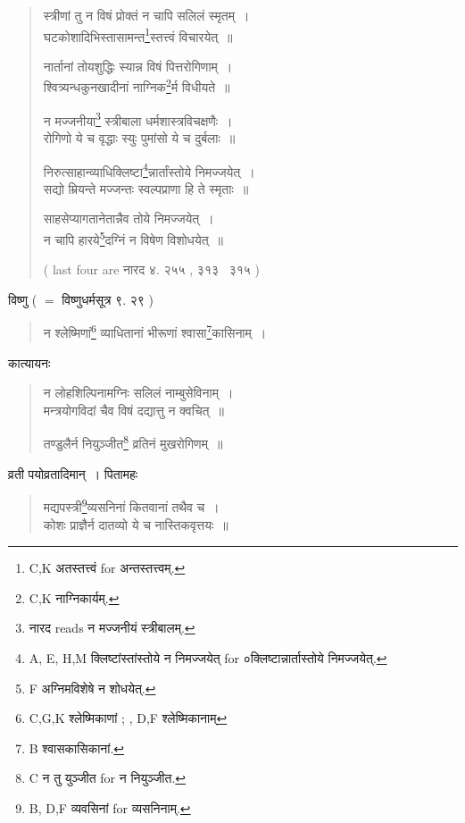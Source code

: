 \documentclass[11pt, openany]{book}
\begin{document}
\begin{quote}
{\vy स्त्रीणां तु न विषं प्रोक्तं न चापि सलिलं स्मृतम्~।\\
घटकोशादिभिस्तासामन्त\renewcommand{\thefootnote}{1}\footnote{C,K अतस्तत्त्वं for अन्तस्तत्त्वम्.}स्तत्त्वं विचारयेत्~॥

नार्तानां तोयशुद्धिः स्यान्न विषं पित्तरोगिणाम्~।\\
श्वित्र्यन्धकुनखादीनां नाग्निक\renewcommand{\thefootnote}{2}\footnote{C,K नाग्निकार्यम्.}र्म विधीयते~॥

न मज्जनीया\renewcommand{\thefootnote}{3}\footnote{नारद reads न मज्जनीयं स्त्रीबालम्.} स्त्रीबाला धर्मशास्त्रविचक्षणैः~।\\
रोगिणो ये च वृद्धाः स्युः पुमांसो ये च दुर्बलाः~॥

निरुत्साहान्व्याधिक्लिष्टा\renewcommand{\thefootnote}{4}\footnote{A, E, H,M क्लिष्टांस्तांस्तोये न निमज्जयेत् for ०क्लिष्टान्नार्तास्तोये निमज्जयेत्.}न्नार्तांस्तोये निमज्जयेत्~।\\
सद्यो म्रियन्ते मज्जन्तः स्वल्पप्राणा हि ते स्मृताः~॥

साहसेप्यागतानेतान्नैव तोये निमज्जयेत्~।\\
न चापि हारये\renewcommand{\thefootnote}{5}\footnote{F अग्निमविशेषे न शोधयेत्.}दग्निं न विषेण विशोधयेत्~॥} ( last four are नारद ४. २५५ , ३१३ \textendash\ ३१५ )
\end{quote}

विष्णु ( $=$ विष्णुधर्मसूत्र ९. २९ ) 

\begin{quote}
{\vy न श्लेष्मिणां\renewcommand{\thefootnote}{6}\footnote{C,G,K श्लेष्मिकाणां ; , D,F श्लेष्मिकानाम्} व्याधितानां भीरूणां श्वासा\renewcommand{\thefootnote}{7}\footnote{B श्वासकासिकानां.}कासिनाम्~।}
\end{quote}

कात्यायनः

\begin{quote}
{\vy न लोहशिल्पिनामग्निः सलिलं नाम्बुसेविनाम्~।\\
मन्त्रयोगविदां चैव विषं दद्यात्तु न क्वचित्~॥

तण्डुलैर्न नियुञ्जीत\renewcommand{\thefootnote}{8}\footnote{C न तु युञ्जीत for न नियुञ्जीत.} व्रतिनं मुखरोगिणम्~॥}
\end{quote}

\newpage
{}

व्रती पयोव्रतादिमान्~। पितामहः

\begin{quote}
{\vy मद्यपस्त्री\renewcommand{\thefootnote}{1}\footnote{B, D,F व्यवसिनां for व्यसनिनाम्.}व्यसनिनां कितवानां तथैव च~।\\
कोशः प्राज्ञैर्न दातव्यो ये च नास्तिकवृत्तयः~॥}
\end{quote}
\end{document}
